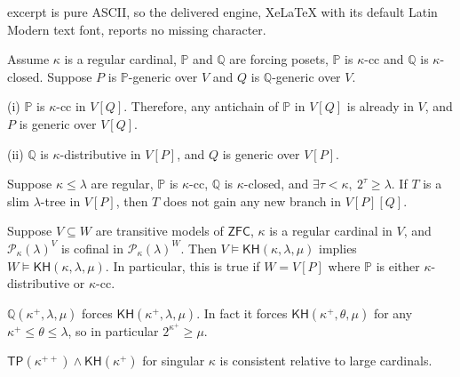 \documentclass[10pt,a4paper]{amsart}
\begin{document}
excerpt is pure ASCII, so the delivered engine, XeLaTeX with its default Latin Modern text font, reports no missing character.
\begin{lemma}[Easton]\label{forcing_Easton}
Assume $\kappa$ is a regular cardinal, $\mathbb{P}$ and $\mathbb{Q}$ are forcing posets, $\mathbb{P}$ is $\kappa$-cc and $\mathbb{Q}$ is $\kappa$-closed. Suppose $P$ is $\mathbb{P}$-generic over $V$ and $Q$ is $\mathbb{Q}$-generic over $V$.

(i) $\mathbb{P}$ is $\kappa$-cc in $V[Q]$. Therefore, any antichain of $\mathbb{P}$ in $V[Q]$ is already in $V$, and $P$ is generic over $V[Q]$.

(ii) $\mathbb{Q}$ is $\kappa$-distributive in $V[P]$, and $Q$ is generic over $V[P]$.
\end{lemma}

\begin{lemma}\label{forcing_branch_Unger_formerly_closed}
Suppose $\kappa\leq\lambda$ are regular, $\mathbb{P}$ is $\kappa$-cc, $\mathbb{Q}$ is $\kappa$-closed, and $\exists\tau<\kappa,\ 2^\tau\geq\lambda$. If $T$ is a slim $\lambda$-tree in $V[P]$, then $T$ does not gain any new branch in $V[P][Q]$.
\end{lemma}

\begin{lemma}\label{KH_upward}
Suppose $V\subseteq W$ are transitive models of $\mathsf{ZFC}$, $\kappa$ is a regular cardinal in $V$, and $\mathcal{P}_\kappa(\lambda)^V$ is cofinal in $\mathcal{P}_\kappa(\lambda)^W$. Then $V\models\mathsf{KH}(\kappa,\lambda,\mu)$ implies $W\models\mathsf{KH}(\kappa,\lambda,\mu)$. In particular, this is true if $W=V[P]$ where $\mathbb{P}$ is either $\kappa$-distributive or $\kappa$-cc.\end{lemma}

\begin{lemma}\label{KH_Q_effect}
$\mathbb{Q}(\kappa^+,\lambda,\mu)$ forces $\mathsf{KH}(\kappa^+,\lambda,\mu)$. In fact it forces $\mathsf{KH}(\kappa^+,\theta,\mu)$ for any $\kappa^+\leq\theta\leq\lambda$, so in particular $2^{\kappa^+}\geq\mu$.
\end{lemma}

\begin{theorem}
$\mathsf{TP(\kappa^{++})\land\mathsf{KH}(\kappa^+)}$ for singular $\kappa$ is consistent relative to large cardinals.
\end{theorem}
\end{document}
